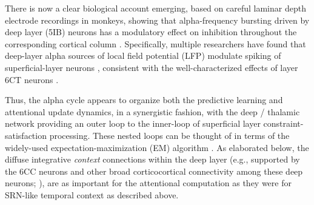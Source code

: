 \documentclass[11pt,twoside]{article}
\newif\myifpdf
\begin{document}
There is now a clear biological account emerging, based on careful laminar depth electrode recordings in monkeys, showing that alpha-frequency bursting driven by deep layer (5IB) neurons has a modulatory effect on inhibition throughout the corresponding cortical column \cite{DoughertyCoxNinomiyaEtAl17,vanKerkoerleSelfDagninoEtAl14,BortoneOlsenScanziani14,OlsenBortoneAdesnikEtAl12}.  Specifically, multiple researchers have found that deep-layer alpha sources of local field potential (LFP) modulate spiking of superficial-layer neurons \cite{DoughertyCoxNinomiyaEtAl17,vanKerkoerleSelfDagninoEtAl14,HaegensNacherLunaEtAl11,LakatosKarmosMehtaEtAl08,SpaakBonnefondMaierEtAl12,BollimuntaMoSchroederEtAl11,BollimuntaChenSchroederEtAl08}, consistent with the well-characterized effects of layer 6CT neurons \cite{BortoneOlsenScanziani14,OlsenBortoneAdesnikEtAl12}.  

Thus, the alpha cycle appears to organize both the predictive learning and attentional update dynamics, in a synergistic fashion, with the deep / thalamic network providing an outer loop to the inner-loop of superficial layer constraint-satisfaction processing.  These nested loops can be thought of in terms of the widely-used expectation-maximization (EM) algorithm \cite{DempsterLairdRubin77}.  As elaborated below, the diffuse integrative {\em context} connections within the deep layer (e.g., supported by the 6CC neurons and other broad corticocortical connectivity among these deep neurons; ), are as important for the attentional computation as they were for SRN-like temporal context as described above.
\end{document}
